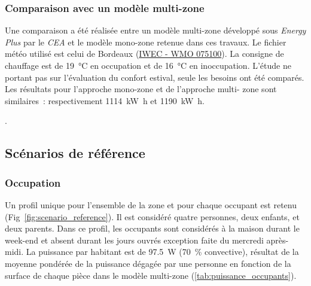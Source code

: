 \subsubsection{Comparaison avec un modèle multi-zone} %
\label{ssub:comparaison_avec_un_modele_multi_zone}
Une comparaison a été réalisée entre un modèle multi-zone développé sous \emph{Energy
Plus} par le \emph{CEA} et le modèle mono-zone retenue dans ces travaux. Le fichier météo
utilisé est celui de Bordeaux
(\href{https://www.energyplus.net/weather-download/europe_wmo_region_6/FRA//FRA_Bordeaux.075100_IWEC/all}{IWEC - WMO 075100}).
La consigne de chauffage est de \SI{19}{\celsius} en occupation et de \SI{16}{\celsius} en
inoccupation. L’étude ne portant pas sur l’évaluation du confort estival, seule les
besoins ont été comparés. Les résultats pour l’approche mono-zone et de l’approche multi-
zone sont similaires~: respectivement \SI{1114}{\kilo\watt\hour} et
\SI{1190}{\kilo\watt\hour}.

.


\subsection{Scénarios de référence} %
\label{sub:scénarios_de_référence}
\subsubsection{Occupation} %
\label{ssub:profil_d_occupation}
Un profil unique pour l’ensemble de la zone et pour chaque occupant est retenu
(Fig~\ref{fig:scenario_reference}). Il est considéré quatre personnes, deux enfants, et deux parents. Dans ce profil,
les occupants sont considérés à la maison durant le week-end et absent durant les jours
ouvrés exception faite du mercredi après-midi.
La puissance par habitant est de \SI{97.5}{\watt} (\SI{70}{\percent} convective), résultat
de la moyenne pondérée de la puissance dégagée par une personne en fonction de la surface
de chaque pièce dans le modèle multi-zone (\ref{tab:puissance_occupants}).

